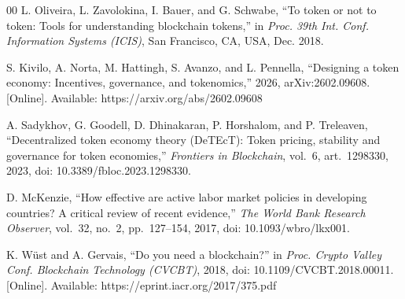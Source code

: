 \documentclass[conference]{IEEEtran}
\begin{document}
\begin{thebibliography}{00}
	 L. Oliveira, L. Zavolokina, I. Bauer, and G. Schwabe, ``To token or not to token: Tools for understanding blockchain tokens,'' in \emph{Proc. 39th Int. Conf. Information Systems (ICIS)}, San Francisco, CA, USA, Dec. 2018.

	 S. Kivilo, A. Norta, M. Hattingh, S. Avanzo, and L. Pennella, ``Designing a token economy: Incentives, governance, and tokenomics,'' 2026, arXiv:2602.09608. [Online]. Available: https://arxiv.org/abs/2602.09608

	 A. Sadykhov, G. Goodell, D. Dhinakaran, P. Horshalom, and P. Treleaven, ``Decentralized token economy theory (DeTEcT): Token pricing, stability and governance for token economies,'' \emph{Frontiers in Blockchain}, vol.~6, art.~1298330, 2023, doi: 10.3389/fbloc.2023.1298330.

	 D. McKenzie, ``How effective are active labor market policies in developing countries? A critical review of recent evidence,'' \emph{The World Bank Research Observer}, vol.~32, no.~2, pp.~127--154, 2017, doi: 10.1093/wbro/lkx001.

	 K. W\"{u}st and A. Gervais, ``Do you need a blockchain?'' in \emph{Proc. Crypto Valley Conf. Blockchain Technology (CVCBT)}, 2018, doi: 10.1109/CVCBT.2018.00011. [Online]. Available: https://eprint.iacr.org/2017/375.pdf

\end{thebibliography}
\vspace{12pt}
\end{document}
